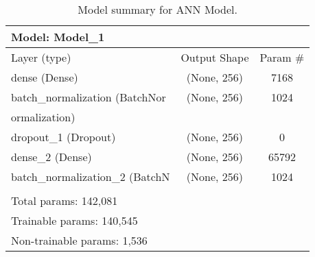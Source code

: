 \begin{table}[h] 
\begin{tabular}{lcc} 
Model: Model\_1 \\ \hline 
 Layer (type)                  & Output Shape                & Param \#    \\ \hline \hline 
 dense (Dense)                 & (None, 256)                 & 7168       \\ \hline 
 batch\_normalization (BatchNor &  (None, 256)                & 1024       \\ \hline 

 ormalization)                 &                             &            \\ \hline 
 dropout\_1 (Dropout)           & (None, 256)                 & 0          \\ \hline 
 dense\_2 (Dense)               & (None, 256)                 & 65792      \\ \hline 
 batch\_normalization\_2 (BatchN &  (None, 256)                & 1024       \\ \hline 

                               &                             &            \\ \hline \hline 
Total params: 142,081 \\ 
Trainable params: 140,545 \\ 
Non-trainable params: 1,536 \\ \hline 
\end{tabular} 
\caption{Model summary for ANN Model.} 
\label{tab:model-summary} 
\end{table}